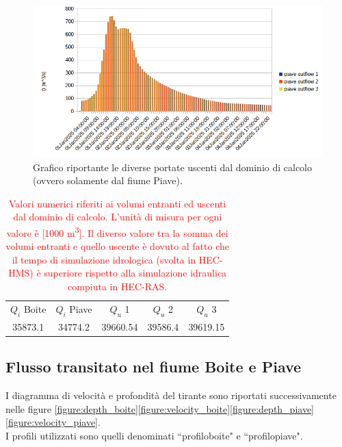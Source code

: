 \begin{figure}[H] \centering
    \includegraphics[scale=0.6]{immagini/portate_deflusso.png}
    \caption{Grafico riportante le diverse portate uscenti dal dominio di calcolo (ovvero solamente dal fiume Piave).}
    \label{figure:portate_deflusso}
\end{figure}

\begin{table}[H] \centering
    \caption{\textcolor{red}{Valori numerici riferiti ai volumi entranti ed uscenti dal dominio di calcolo. L'unità di misura per ogni valore è [1000 \unit{m^3}]. Il diverso valore tra la somma dei volumi entranti e quello uscente è dovuto al fatto che il tempo di simulazione idrologica (svolta in HEC-HMS) è superiore rispetto alla simulazione idraulica compiuta in HEC-RAS.}}
    \begin{tabular}{ccccc}
    \toprule
    $Q_i$ Boite & $Q_i$ Piave & $Q_u$ 1 & $Q_u$ 2 & $Q_u$ 3\\
     35873.1 &34774.2 & 39660.54 &  39586.4 & 39619.15\\ 
    \bottomrule 
    \end{tabular}
    \end{table}

\subsection{Flusso transitato nel fiume Boite e Piave}
I diagramma di velocità e profondità del tirante sono riportati successivamente nelle figure \eqref{figure:depth_boite}\eqref{figure:velocity_boite}\eqref{figure:depth_piave}\eqref{figure:velocity_piave}.\\
I profili utilizzati sono quelli denominati ``profilo\textunderscore boite" e ``profilo\textunderscore piave".

